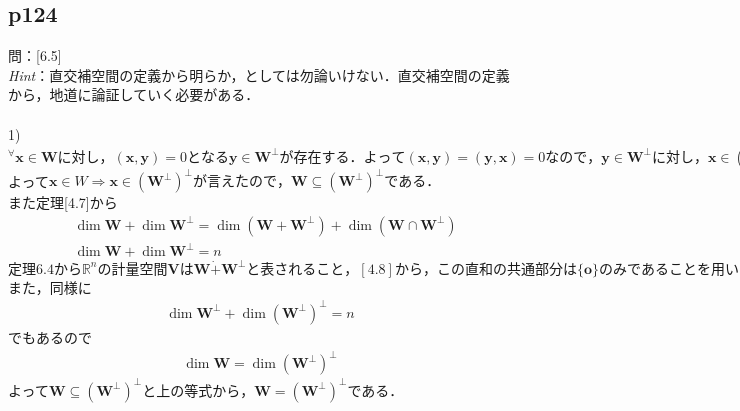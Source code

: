 \documentclass[dvipdfmx,uplatex,11pt]{jsarticle}
\begin{document}
\subsection{p124}
\noindent
問：[6.5]\\
\textsl{Hint}：直交補空間の定義から明らか，としては勿論いけない．直交補空間の定義から，地道に論証していく必要がある．\\ 
\dotfill \\
1)$^{\forall}\bm{x} \in \bm{W}に対し，(\bm{x},\bm{y})=0となる\bm{y} \in \bm{W}^{\perp}が存在する．よって(\bm{x},\bm{y})=(\bm{y},\bm{x})=0なので，\bm{y} \in \bm{W}^{\perp}に対し，\bm{x} \in (\bm{W}^{\perp})^{\perp}である．$\\
よって$\bm{x} \in W \Longrightarrow \bm{x} \in  (\bm{W}^{\perp})^{\perp}が言えたので，\bm{W} \subseteq  (\bm{W}^{\perp})^{\perp}である．$\\
また定理[4.7]から
\begin{eqnarray*}
& \dim \bm{W} +\dim \bm{W}^{\perp} =\dim (\bm{W} +\bm{W}^{\perp} )+\dim (\bm{W} \cap \bm{W}^{\perp} ) \\
& \dim \bm{W} +\dim \bm{W}^{\perp} =n
\end{eqnarray*}
$定理6.4から\mathbb{R}^nの計量空間\bm{V}は\bm{W}\dot{+}\bm{W}^{\perp}と表されること，[4.8]から，この直和の共通部分は\{ \bm{o} \}のみであることを用いた．$\\
また，同様に
\begin{eqnarray*}
\dim \bm{W}^{\perp} +\dim (\bm{W}^{\perp})^{\perp} =n
\end{eqnarray*}
でもあるので
\begin{eqnarray*}
\dim \bm{W} =\dim (\bm{W}^{\perp})^{\perp}
\end{eqnarray*}
よって$\bm{W} \subseteq  (\bm{W}^{\perp})^{\perp}と上の等式から，\bm{W} =  (\bm{W}^{\perp})^{\perp}$である．
%
%
%
\newpage
%
%
%
\end{document}
